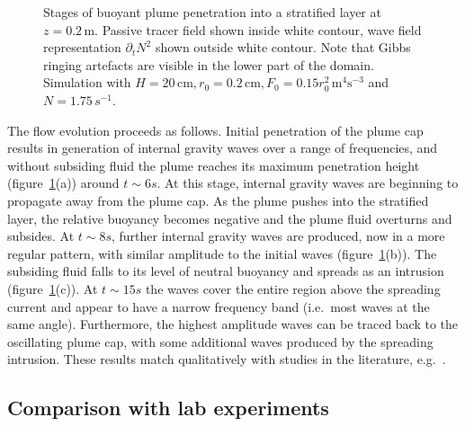 \documentclass[a4paper]{article}
\begin{document}
\begin{figure}
	\centering
	\caption{Stages of buoyant plume penetration into a stratified layer at $z=0.2\, \mathrm{m}$. Passive
	tracer field shown inside white contour, wave field representation $\partial_t N^2$ shown outside
	white contour. Note that Gibbs ringing artefacts are visible in the lower part of the domain. Simulation
	with $H = 20\,\mathrm{cm}, r_0 = 0.2 \, \mathrm{cm}, F_0 = 0.15r_0^2 \, \mathrm{m}^4 \mathrm{s}^{-3}$ and
	$N = 1.75\, s^{-1}$.}
	\label{fig:evol}
\end{figure}

The flow evolution proceeds as follows. Initial penetration of the plume cap results in generation of internal
gravity waves over a range of frequencies, and without subsiding fluid the plume reaches its maximum
penetration height (figure~\ref{fig:evol}(a)) around $t \sim 6 s$. At this stage, internal gravity waves are
beginning to propagate away from the plume cap. As the plume pushes into the stratified layer, the relative
buoyancy becomes negative and the plume fluid overturns and subsides. At $t \sim 8 s$, further internal
gravity waves are produced, now in a more regular pattern, with similar amplitude to the initial waves
(figure~\ref{fig:evol}(b)). The subsiding fluid falls to its level of neutral buoyancy and spreads as an
intrusion (figure~\ref{fig:evol}(c)). At $t \sim 15 s$ the waves cover the entire region above the spreading
current and appear to have a narrow frequency band (i.e.\ most waves at the same angle). Furthermore, the highest
amplitude waves can be traced back to the oscillating plume cap, with some additional waves produced by the
spreading intrusion. These results match qualitatively with studies in the literature, e.g.\
\citet{ansong2008, hunt2015, devenish2010}.

\subsection{Comparison with lab experiments}
\end{document}
